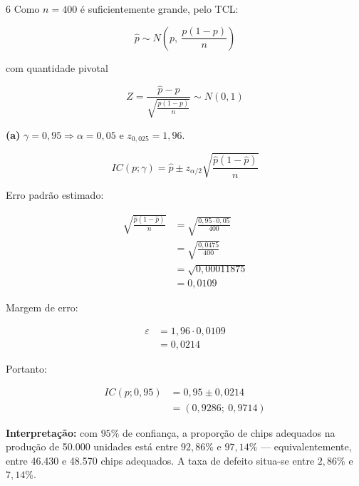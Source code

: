 \documentclass[8pt, a4paper, landscape]{extarticle}
\begin{document}
\begin{multicols}{6}
Como $n = 400$ é suficientemente grande, pelo TCL:

\begin{equation*}
\hat{p} \sim N\left(p,\ \frac{p(1-p)}{n}\right)
\end{equation*}

com quantidade pivotal

\begin{equation*}
Z = \frac{\hat{p} - p}{\sqrt{\frac{p(1-p)}{n}}} \sim N(0,1)
\end{equation*}

\vspace{0.2cm}

\textbf{(a)} $\gamma = 0,95 \Rightarrow \alpha = 0,05$ e $z_{0,025} = 1,96$.

\begin{equation*}
IC(p;\gamma) = \hat{p} \pm z_{\alpha/2}\sqrt{\frac{\hat{p}(1-\hat{p})}{n}}
\end{equation*}

Erro padrão estimado:

\begin{equation*}
\begin{split}
\sqrt{\frac{\hat{p}(1-\hat{p})}{n}} &= \sqrt{\frac{0,95 \cdot 0,05}{400}} \\
&= \sqrt{\frac{0,0475}{400}} \\
&= \sqrt{0,00011875} \\
&= 0,0109
\end{split}
\end{equation*}

Margem de erro:

\begin{equation*}
\begin{split}
\varepsilon &= 1,96 \cdot 0,0109 \\
&= 0,0214
\end{split}
\end{equation*}

Portanto:

\begin{equation*}
\begin{split}
IC(p;0,95) &= 0,95 \pm 0,0214 \\
&= (0,9286;\ 0,9714)
\end{split}
\end{equation*}

\textbf{Interpretação:} com $95\%$ de confiança, a proporção de chips adequados na produção de 50.000 unidades está entre $92,86\%$ e $97,14\%$ — equivalentemente, entre 46.430 e 48.570 chips adequados. A taxa de defeito situa-se entre $2,86\%$ e $7,14\%$.


\end{multicols}
\end{document}
